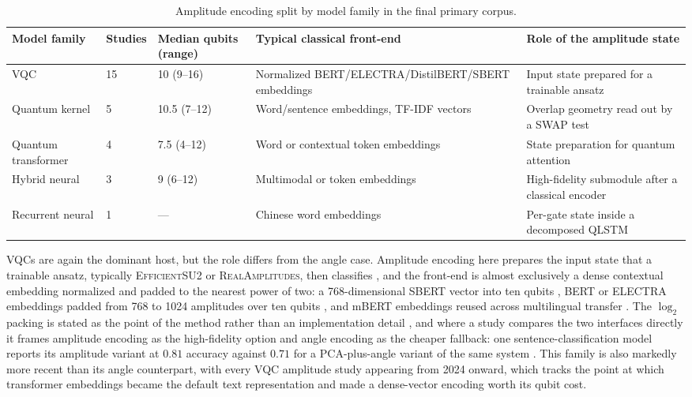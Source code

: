 \documentclass{ieeeaccess}
\begin{document}
\begin{table}[t]
\caption{Amplitude encoding split by model family in the final primary corpus.}
\label{tab:amplitude_by_family}
\centering
\scriptsize
\begin{tabular}{@{}p{} p{} p{} p{} p{}@{}}
\hline
\textbf{Model family} & \textbf{Studies} & \textbf{Median qubits (range)} & \textbf{Typical classical front-end} & \textbf{Role of the amplitude state} \\
\hline
VQC & 15 & 10 (9--16) & Normalized BERT/ELECTRA/DistilBERT/SBERT embeddings & Input state prepared for a trainable ansatz \\
Quantum kernel & 5 & 10.5 (7--12) & Word/sentence embeddings, TF-IDF vectors & Overlap geometry read out by a SWAP test \\
Quantum transformer & 4 & 7.5 (4--12) & Word or contextual token embeddings & State preparation for quantum attention \\
Hybrid neural & 3 & 9 (6--12) & Multimodal or token embeddings & High-fidelity submodule after a classical encoder \\
Recurrent neural & 1 & --- & Chinese word embeddings & Per-gate state inside a decomposed QLSTM \\
\hline
\end{tabular}
\end{table}

VQCs are again the dominant host, but the role differs from the angle case. Amplitude encoding here prepares the input state that a trainable ansatz, typically \textsc{EfficientSU2} or \textsc{RealAmplitudes}, then classifies \cite{korrapati_quantum_2025}, and the front-end is almost exclusively a dense contextual embedding normalized and padded to the nearest power of two: a 768-dimensional SBERT vector into ten qubits \cite{guarasci_applying_2025}, BERT or ELECTRA embeddings padded from 768 to 1024 amplitudes over ten qubits \cite{buonaiuto_quantum_2024}, and mBERT embeddings reused across multilingual transfer \cite{buonaiuto_multilingual_2025}. The $\log_2$ packing is stated as the point of the method rather than an implementation detail \cite{liu_hcqnsc_2026}, and where a study compares the two interfaces directly it frames amplitude encoding as the high-fidelity option and angle encoding as the cheaper fallback: one sentence-classification model reports its amplitude variant at $0.81$ accuracy against $0.71$ for a PCA-plus-angle variant of the same system \cite{guarasci_applying_2025}. This family is also markedly more recent than its angle counterpart, with every VQC amplitude study appearing from 2024 onward, which tracks the point at which transformer embeddings became the default text representation and made a dense-vector encoding worth its qubit cost.
\end{document}
